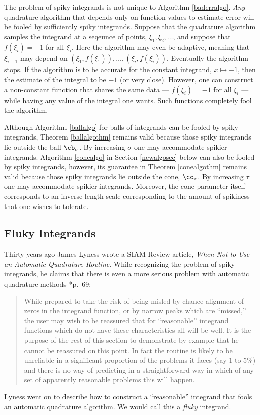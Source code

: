 \documentclass[]{article}
\theoremstyle{definition}
\theoremstyle{remark}
\begin{document}
The problem of spiky integrands is not unique to Algorithm \ref{baderralgo}.  \emph{Any} quadrature algorithm that depends only on function values to estimate error will be fooled by sufficiently spiky integrands.  Suppose that the quadrature algorithm samples the integrand at a seqeunce of points, $\xi_1, \xi_2, \ldots$, and suppose that $f(\xi_i)=-1$ for all $\xi_i$.  Here the algorithm may even be adaptive, meaning that $\xi_{i+1}$ may depend on $(\xi_1, f(\xi_1)), \ldots, (\xi_i, f(\xi_i))$.  Eventually the algorithm stops.  If the algorithm is to be accurate for the constant integrand, $x \mapsto -1$, then the estimate of the integral to be $-1$ (or very close).  However, one can construct a non-constant function that shares the same data --- $f(\xi_i)=-1$ for all $\xi_i$ --- while having any value of the integral one wants. Such functions completely fool the algorithm.

Although Algorithm \ref{ballalgo} for balls of integrands can be fooled by spiky integrands, Theorem \ref{ballalgothm} remains valid because those spiky integrands lie outside the ball $\cb_{\sigma}$.  By increasing $\sigma$ one may accommodate spikier integrands.  Algorithm \ref{conealgo} in Section \ref{newalgosec} below can also be fooled by spiky integrands, however, its guarantee in Theorem \ref{conealgothm} remains valid because those spiky integrands lie outside the cone, $\cc_{\tau}$.  By increasing $\tau$ one may accommodate spikier integrands.  Moreover, the cone parameter itself corresponds to an inverse length scale corresponding to the amount of spikiness that one wishes to tolerate.

\subsection{Fluky Integrands} \label{flukysubsec}

Thirty years ago James Lyness wrote a SIAM Review article, \emph{When Not to Use an Automatic Quadrature Routine}.  While recognizing the problem of spiky integrands, he claims that there is even a more serious problem with automatic quadrature methods   \cite{Lyn83}*{p.\ 69}:
\begin{quote}
While prepared to take the risk of being misled by chance alignment of zeros in the integrand function, or by narrow peaks which are ``missed,'' the user may wish to be reassured that for ``reasonable'' integrand functions which do not have these characteristics all will be well. It is the purpose of the rest of this section to demonstrate by example that he cannot be reassured on this point. In fact the routine is likely to be unreliable in a significant proportion of the problems it faces (say $1$ to $5\%$) and there is no way of predicting in a straightforward way in which of any set of apparently reasonable problems this will happen.
\end{quote}
Lyness went on to describe how to construct a ``reasonable'' integrand that fools an automatic quadrature algorithm.  We would call this a \emph{fluky} integrand.  
\end{document}
